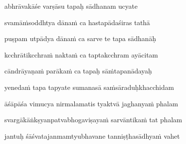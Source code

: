 abhrāvakāśe varṣāsu tapaḥ sādhanam ucyate \veg\dontdisplaylinenum
{}

svamāṁsoddhtya dānaṁ ca hastapādaśiras tathā\thinspace{\dandab} \dontdisplaylinenum

puṣpam utpādya dānaṁ ca sarve te tapa sādhanāḥ \veg\dontdisplaylinenum
{}

kcchrātikcchraṁ naktaṁ ca taptakcchram ayācitam\thinspace{\dandab} \dontdisplaylinenum

cāndrāyaṇaṁ parākaṁ ca tapaḥ sāṁtapanādayaḥ \veg\dontdisplaylinenum
{}

\ujvers\nemsloka 
yenedaṁ tapa tapyate sumanasā saṁsāraduḥkhacchidam
\dontdisplaylinenum

\nemslokab 
āśāpāśa vimucya nirmalamatis tyaktvā jaghanyaṁ phalam \danda\dontdisplaylinenum

\nemslokac 
svargākāṅkṣyanpatvabhogaviṣayaṁ sarvāntikaṁ tat phalam
\dontdisplaylinenum

\nemslokad 
jantuḥ śāśvatajanmamtyubhavane tanniṣṭhasādhyaṁ vahet \veg\dontdisplaylinenum

\vers


